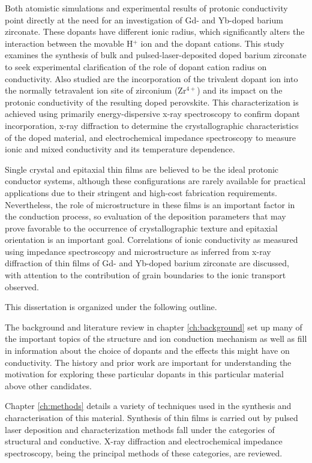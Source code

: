 Both atomistic simulations and experimental results of protonic conductivity point directly at the need for an investigation of Gd- and Yb-doped barium zirconate. These dopants have different ionic radius, which significantly alters the interaction between the movable H$^{+}$ ion and the dopant cations. This study examines the synthesis of bulk and pulsed-laser-deposited doped barium zirconate to seek experimental clarification of the role of dopant cation radius on conductivity. Also studied are the incorporation of the trivalent dopant ion into the normally tetravalent ion site of zirconium (Zr$^{4+}$) and its impact on the protonic conductivity of the resulting doped perovskite. This characterization is achieved using primarily energy-dispersive x-ray spectroscopy to confirm dopant incorporation, x-ray diffraction to determine the crystallographic characteristics of the doped material, and electrochemical impedance spectroscopy to measure ionic and mixed conductivity and its temperature dependence.

Single crystal and epitaxial thin films are believed to be the ideal protonic conductor systems, although these configurations are rarely available for practical applications due to their stringent and high-cost fabrication requirements. Nevertheless, the role of microstructure in these films is an important factor in the conduction process, so evaluation of the deposition parameters that may prove favorable to the occurrence of crystallographic texture and epitaxial orientation is an important goal. Correlations of ionic conductivity as measured using impedance spectroscopy and microstructure as inferred from x-ray diffraction of thin films of Gd- and Yb-doped barium zirconate are discussed, with attention to the contribution of grain boundaries to the ionic transport observed.

This dissertation is organized under the following outline. 

The background and literature review in chapter \ref{ch:background} set up many of the important topics of the structure and ion conduction mechanism as well as fill in information about the choice of dopants and the effects this might have on conductivity. The history and prior work are important for understanding the motivation for exploring these particular dopants in this particular material above other candidates. 

Chapter \ref{ch:methods} details a variety of techniques used in the synthesis and characterisation of this material. Synthesis of thin films is carried out by pulsed laser deposition and characterization methods fall under the categories of structural and conductive. X-ray diffraction and electrochemical impedance spectroscopy, being the principal methods of these categories, are reviewed. 

